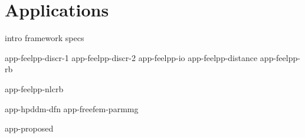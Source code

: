 \chapter{Applications}
\label{chap:applications}

{intro}
{framework}
{specs}

{app-feelpp-discr-1}
{app-feelpp-discr-2}
{app-feelpp-io}
{app-feelpp-distance}
{app-feelpp-rb}

{app-feelpp-nlcrb}

{app-hpddm-dfn}
{app-freefem-parmmg}

{app-proposed}

